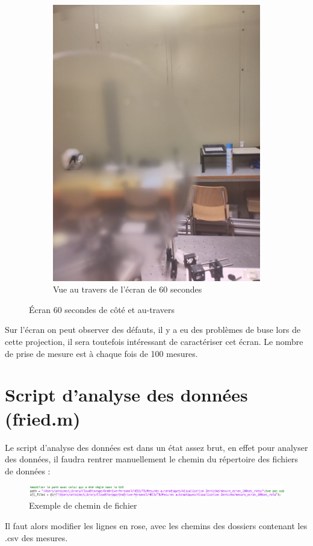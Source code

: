 \begin{figure}[H]
\begin{subfigure}{.5\textwidth}
        \includegraphics[width=1\linewidth]{assets/figures/mesures/60_sec_travers.jpeg}
        \caption{Vue au travers de l'écran de 60 secondes}
    \end{subfigure}
    \caption{Écran 60 secondes de côté et au-travers}
\end{figure}
Sur l'écran on peut observer des défauts, il y a eu des problèmes de buse lors de cette projection, il sera toutefois
intéressant de caractériser cet écran. Le nombre de prise de mesure est à chaque fois de 100 mesures.

\section{Script d'analyse des données (fried.m)}
Le script d'analyse des données est dans un état assez brut, en effet pour analyser des données, il faudra rentrer manuellement
le chemin du répertoire des fichiers de données :
\begin{figure}[H]
    \centering
    \includegraphics[width = 1\textwidth]{assets/figures/mesures/exemple_chemin_fichier.png}
    \caption{Exemple de chemin de fichier}
\end{figure}
Il faut alors modifier les lignes en rose, avec les chemins des dossiers contenant les .csv des mesures.

